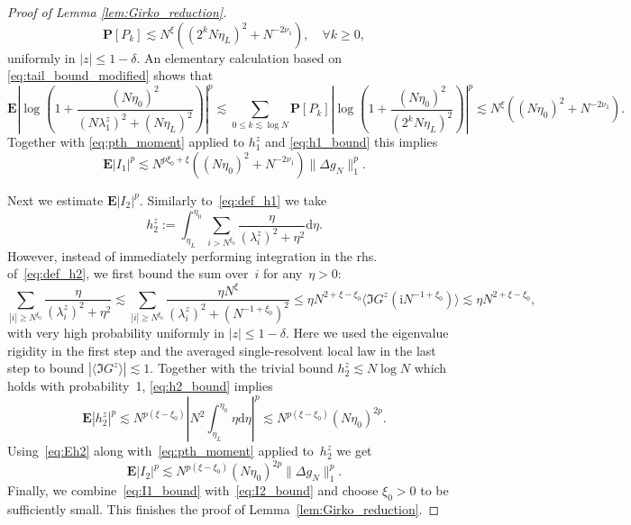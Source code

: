 \documentclass[10pt]{amsart}
\numberwithin{equation}{section}
\newcommand{\dif}{\mathrm{d}}
\newcommand{\E}{\mathbf{E}}
\newcommand{\ii}{\mathrm{i}}
\begin{document}
\begin{proof}[Proof of Lemma \ref{lem:Girko_reduction}]
\begin{equation}
\mathbf{P}\left[P_k\right] \lesssim N^\xi \left((2^kN\eta_L)^2 + N^{-2\nu_1}\right),\quad \forall k\ge 0,
\label{eq:tail_bound_modified}
\end{equation}
uniformly in $|z|\le 1-\delta$. An elementary calculation based on \eqref{eq:tail_bound_modified} shows that
\begin{equation}
\E \left\vert \log \left(1+\frac{(N\eta_0)^2}{(N\lambda_1^z)^2+(N\eta_L)^2}\right)\right\vert^p\!\lesssim\!\! \sum_{0\le k\lesssim \log N}\!\! \mathbf{P}[P_k] \left\vert \log \left(1+\frac{(N\eta_0)^2}{(2^kN\eta_L)^2}\right)\right\vert^p\!\!\lesssim N^\xi\left((N\eta_0)^2 + N^{-2\nu_1}\right)\!.
\label{eq:X_int_bound}
\end{equation}
Together with \eqref{eq:pth_moment} applied to $h^z_1$ and \eqref{eq:h1_bound} this implies
\begin{equation}
\E|I_1|^p \lesssim N^{p\xi_0+\xi}((N\eta_0)^2+N^{-2\nu_1})\lVert \Delta g_N\rVert_1^p.
\label{eq:I1_bound}
\end{equation}

Next we estimate $\E|I_2|^p$. Similarly to~\eqref{eq:def_h1} we take
\begin{equation}
h^z_2:= \int_{\eta_L}^{\eta_0} \sum_{i> N^{\xi_0}}\frac{\eta}{(\lambda_i^z)^2+\eta^2} \dif \eta.
\label{eq:def_h2}
\end{equation}
However, instead of immediately performing integration in the rhs. of~\eqref{eq:def_h2}, we first bound the sum over~$i$ for any~$\eta>0$:
\begin{equation}
\sum_{|i|\ge N^{\xi_0}}\frac{\eta}{(\lambda_i^z)^2+\eta^2} \lesssim \sum_{|i|\ge N^{\xi_0}}\frac{\eta N^\xi}{(\lambda_i^z)^2 + (N^{-1+\xi_0})^2} \le \eta N^{2+\xi-\xi_0}\langle \Im G^z(\ii N^{-1+\xi_0})\rangle\lesssim \eta N^{2+\xi-\xi_0},
\label{eq:h2_bound}
\end{equation}
with very high probability uniformly in $|z|\le 1-\delta$. Here we used the eigenvalue rigidity \cite[Eq.(7.4)]{macroCLT_complex} in the first step and the averaged single-resolvent local law \cite[Eq.(5.4)]{loc_circ_law18} in the last step to bound $|\langle \Im G^z\rangle|\lesssim 1$. Together with the trivial bound $h^z_2\lesssim N\log N$ which holds with probability~1, \eqref{eq:h2_bound} implies
\begin{equation}
\E |h_2^z|^p \lesssim N^{p(\xi-\xi_0)}\left\vert N^2\int_{\eta_L}^{\eta_0}\eta\dif \eta\right\vert^p\lesssim N^{p(\xi-\xi_0)} (N\eta_0)^{2p}.
\label{eq:Eh2}
\end{equation}
Using~\eqref{eq:Eh2} along with~\eqref{eq:pth_moment} applied to~$h^z_2$ we get
\begin{equation}
\E|I_2|^p \lesssim N^{p(\xi-\xi_0)} (N\eta_0)^{2p} \|\Delta g_N\|_1^p.
\label{eq:I2_bound}
\end{equation}
Finally, we combine~\eqref{eq:I1_bound} with~\eqref{eq:I2_bound} and choose $\xi_0>0$ to be sufficiently small. This finishes the proof of Lemma~\ref{lem:Girko_reduction}.
\end{proof}
\end{document}
